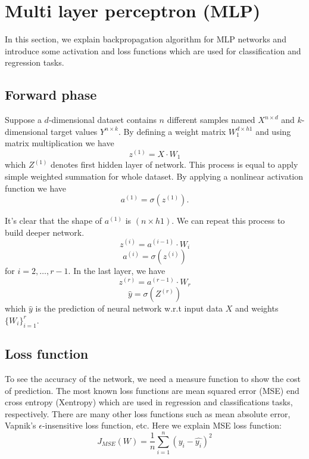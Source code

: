 \documentclass[10pt]{SelfArx} %
\begin{document}

\section{Multi layer perceptron (MLP)}
In this section, we explain backpropagation algorithm for MLP networks and introduce some activation and loss functions which are used for classification and regression tasks. 

\subsection{Forward phase}
Suppose a $d$-dimensional dataset contains $n$ different samples named $X^{n\times d}$ and $k$-dimensional target values $Y^{n\times k}$. By defining a weight matrix $W_{1}^{d\times h1}$ and using matrix multiplication we have
\begin{equation}
z^{(1)} = X \cdot W_1
\end{equation}
which $Z^{(1)}$ denotes first hidden layer of network. This process is equal to apply simple weighted summation for whole dataset. By applying a nonlinear activation function we have
\begin{equation}
a^{(1)} = \sigma(z^{(1)}).
\end{equation}

It's clear that the shape of $a^{(1)}$ is $(n \times h1)$. We can repeat this process to build deeper network.
\begin{equation}
z^{(i)} = a^{(i-1)} \cdot W_i 
\end{equation}
\begin{equation}
a^{(i)} = \sigma(z^{(i)})
\end{equation}
for $i=2,\ldots,r-1$. In the last layer, we have
\begin{equation}
z^{(r)} = a^{(r-1)} \cdot W_r
\end{equation}
\begin{equation}
\hat{y} = \sigma(Z^{(r)})
\end{equation}
which $\hat{y}$ is the prediction of neural network w.r.t input data $X$ and weights $\{W_i\}_{i=1}^r$.

\subsection{Loss function}
To see the accuracy of the network, we need a measure function to show the cost of prediction. The most known loss functions are mean squared error (MSE) end cross entropy (Xentropy) which are used in regression and classifications tasks, respectively. There are many other loss functions such as mean absolute error, Vapnik's $\epsilon$-insensitive loss function, etc. Here we explain MSE loss function:
\begin{equation}
J_{MSE}(W) ={\frac {1}{n}}\sum\limits_{i=1}^{n}(y_{i}-{\hat {y_{i}}})^{2}
\end{equation}
\end{document}
